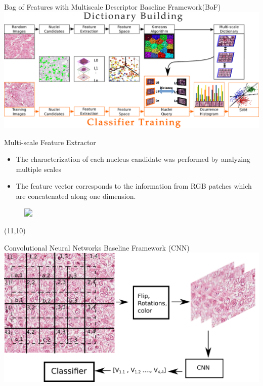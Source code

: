 \documentclass[usenames,dvipsnames]{beamer}
\begin{document}
\begin{frame}{Bag of Features with Multiscale Descriptor Baseline Framework(BoF)}
\includegraphics[width=\textwidth]{imagenes/metodo_BoF.png}


\end{frame}


\begin{frame}{Multi-scale Feature Extractor}
\begin{itemize}
\item<1->\justifying The characterization of each nucleus candidate was performed by analyzing multiple scales 
\item<2-> \justifying The feature vector corresponds to the information from RGB patches which are concatenated along one dimension.
\end{itemize}
\begin{figure}
\hspace{-1cm}\includegraphics<1->[width=7cm]{imagenes/descriptor.jpg}
\end{figure}
 \begin{textblock}{20}(11,10)
 \end{textblock}
\end{frame}



\begin{frame}{Convolutional Neural Networks Baseline Framework  (CNN)}
    \centering
    \includegraphics[width=1\textwidth]{imagenes_cnn/CCn_methodF.png}
 
\end{frame}
\end{document}
